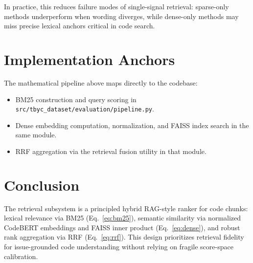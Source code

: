 \documentclass[11pt]{article}
\begin{document}
In practice, this reduces failure modes of single-signal retrieval: sparse-only methods underperform when wording diverges, while dense-only methods may miss precise lexical anchors critical in code search.

\section{Implementation Anchors}
The mathematical pipeline above maps directly to the codebase:
\begin{itemize}
  \item BM25 construction and query scoring in \texttt{src/tbyc\_dataset/evaluation/pipeline.py}.
  \item Dense embedding computation, normalization, and FAISS index search in the same module.
  \item RRF aggregation via the retrieval fusion utility in that module.
\end{itemize}

\section{Conclusion}
The retrieval subsystem is a principled hybrid RAG-style ranker for code chunks: lexical relevance via BM25 (Eq.~\ref{eq:bm25}), semantic similarity via normalized CodeBERT embeddings and FAISS inner product (Eq.~\ref{eq:dense}), and robust rank aggregation via RRF (Eq.~\ref{eq:rrf}). This design prioritizes retrieval fidelity for issue-grounded code understanding without relying on fragile score-space calibration.
\end{document}
